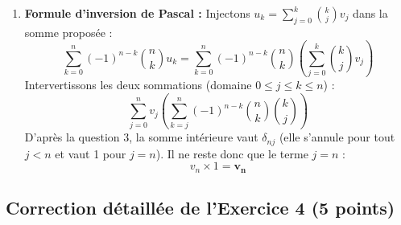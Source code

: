 \documentclass[11pt,a4paper]{article}
\begin{document}
\begin{correctionbox}
\begin{enumerate}
    \item \textbf{Formule d'inversion de Pascal :}
    Injectons $u_k = \sum_{j=0}^k \binom{k}{j} v_j$ dans la somme proposée :
    \[
    \sum_{k=0}^n (-1)^{n - k} \binom{n}{k} u_k = \sum_{k=0}^n (-1)^{n - k} \binom{n}{k} \left( \sum_{j=0}^k \binom{k}{j} v_j \right)
    \]
    Intervertissons les deux sommations (domaine $0 \le j \le k \le n$) :
    \[
    \sum_{j=0}^n v_j \left( \sum_{k=j}^n (-1)^{n - k} \binom{n}{k} \binom{k}{j} \right)
    \]
    D'après la question 3, la somme intérieure vaut $\delta_{nj}$ (elle s'annule pour tout $j < n$ et vaut 1 pour $j = n$).
    Il ne reste donc que le terme $j = n$ :
    \[
    v_n \times 1 = \mathbf{v_n}
    \]
\end{enumerate}
\end{correctionbox}

\vspace{0.4cm}

\subsection*{Correction détaillée de l'Exercice 4 \hfill (5 points)}
\end{document}
